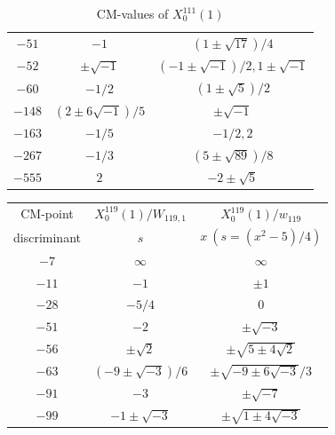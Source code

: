 \documentclass{amsart}
\theoremstyle{definition}
\begin{document}
\begin{appendices}
\begin{table}
\begin{tabular}{|c|c|c|}
${-51}$ & $-1$ & $(1\pm\sqrt{17})/{4}$   \\ 
${-52}$ & $\pm\sqrt{-1}$ & $(-1\pm \sqrt{-1})/{2},1\pm \sqrt{-1}$   \\ 
${-60}$ & $-{1}/{2}$ & $(1\pm\sqrt{5})/{2}$   \\ 
${-148}$ & $(2\pm6\sqrt{-1})/{5}$ & $\pm \sqrt{-1}$  \\ 
${-163}$ & $-{1}/{5}$ & $-{1}/{2},2$ \\ 
${-267}$ & $-{1}/{3}$ & $(5\pm\sqrt{89})/{8}$  \\ 
${-555}$ & $2$ & $-2\pm\sqrt{5}$ 
\\ \hline


\end{tabular}
\bigskip
\caption{CM-values of $X^{111}_0(1)$}


\end{table}


































\renewcommand{\arraystretch}{1.5}
\tabcolsep=10pt                         
\begin{table}
\begin{tabular}{|c|c|c|}
\hline
CM-point& ${X_{0}^{119}(1)/W_{119,1}}$ & ${X_{0}^{119}(1)/w_{119}}$ \\ 
         discriminant & $s$ & $x\ (s=(x^2-5)/{4})$   \\ \hline
${-7}$ & $\infty $ & $\infty $ \\ 

${-11}$ & $-1$ & $\pm1$   \\ 
${-28}$ & $-{5}/{4}$ & $0$   \\ 
${-51}$ & $-2$ & $\pm\sqrt{-3}$  \\ 
${-56}$ & $\pm\sqrt{2}$ & $\pm\sqrt{5\pm4\sqrt{2}}$ \\ 
${-63}$ & $(-9\pm\sqrt{-3})/{6}$ & ${\pm\sqrt{-9\pm6\sqrt{-3}}}/{3}$   \\ 
${-91}$ & $-3$ & $\pm\sqrt{-7}$  \\ 
${-99}$ & $-1\pm\sqrt{-3}$ & $\pm\sqrt{1\pm4\sqrt{-3}}$ 
\\ 


\end{tabular}
\end{table}
\end{appendices}
\end{document}
